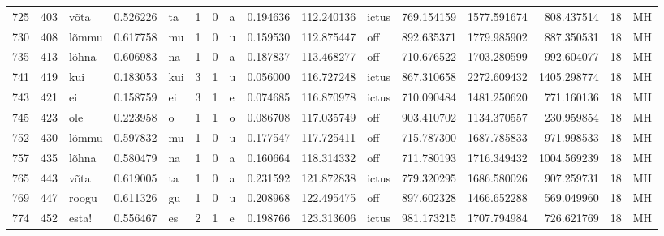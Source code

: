 \begin{tabular}{lrlrllllrrlrrrll}
725  &         403 &             võta &  0.526226 &      ta &        1 &      0 &       a &      0.194636 &    112.240136 &  ictus &   769.154159 &  1577.591674 &   808.437514 &     18 &        MH \\
730  &         408 &            lõmmu &  0.617758 &      mu &        1 &      0 &       u &      0.159530 &    112.875447 &    off &   892.635371 &  1779.985902 &   887.350531 &     18 &        MH \\
735  &         413 &            lõhna &  0.606983 &      na &        1 &      0 &       a &      0.187837 &    113.468277 &    off &   710.676522 &  1703.280599 &   992.604077 &     18 &        MH \\
741  &         419 &              kui &  0.183053 &     kui &        3 &      1 &       u &      0.056000 &    116.727248 &  ictus &   867.310658 &  2272.609432 &  1405.298774 &     18 &        MH \\
743  &         421 &               ei &  0.158759 &      ei &        3 &      1 &       e &      0.074685 &    116.870978 &  ictus &   710.090484 &  1481.250620 &   771.160136 &     18 &        MH \\
745  &         423 &              ole &  0.223958 &       o &        1 &      1 &       o &      0.086708 &    117.035749 &    off &   903.410702 &  1134.370557 &   230.959854 &     18 &        MH \\
752  &         430 &            lõmmu &  0.597832 &      mu &        1 &      0 &       u &      0.177547 &    117.725411 &    off &   715.787300 &  1687.785833 &   971.998533 &     18 &        MH \\
757  &         435 &            lõhna &  0.580479 &      na &        1 &      0 &       a &      0.160664 &    118.314332 &    off &   711.780193 &  1716.349432 &  1004.569239 &     18 &        MH \\
765  &         443 &             võta &  0.619005 &      ta &        1 &      0 &       a &      0.231592 &    121.872838 &  ictus &   779.320295 &  1686.580026 &   907.259731 &     18 &        MH \\
769  &         447 &            roogu &  0.611326 &      gu &        1 &      0 &       u &      0.208968 &    122.495475 &    off &   897.602328 &  1466.652288 &   569.049960 &     18 &        MH \\
774  &         452 &            esta! &  0.556467 &      es &        2 &      1 &       e &      0.198766 &    123.313606 &  ictus &   981.173215 &  1707.794984 &   726.621769 &     18 &        MH \\

\end{tabular}

